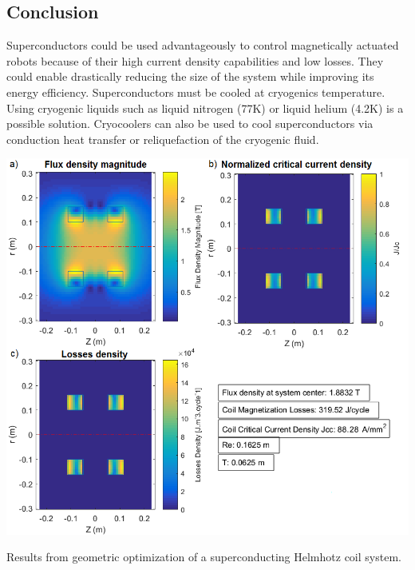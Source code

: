\documentclass{ws-jmrr}
\begin{document}
\begin{multicols}{2}
\section{Conclusion}
Superconductors could be used advantageously to control magnetically actuated robots because of their high current density capabilities and low losses. They could enable drastically reducing the size of the system while improving its energy efficiency. Superconductors must be cooled at cryogenics temperature. Using cryogenic liquids such as liquid nitrogen (77K) or liquid helium (4.2K) is a possible solution. Cryocoolers can also be used to cool superconductors via conduction heat transfer or reliquefaction of the cryogenic fluid.\par 
\begin{figurehere}
	\begin{center}
	\includegraphics[width=\linewidth]{SimResults.png}
	\label{Results}
	\vspace{-0.5cm}
	\caption{Results from geometric optimization of a superconducting Helmhotz coil system.}
	\end{center}
\end{figurehere}
\vspace{-0.5cm}



\end{multicols}
\end{document}
